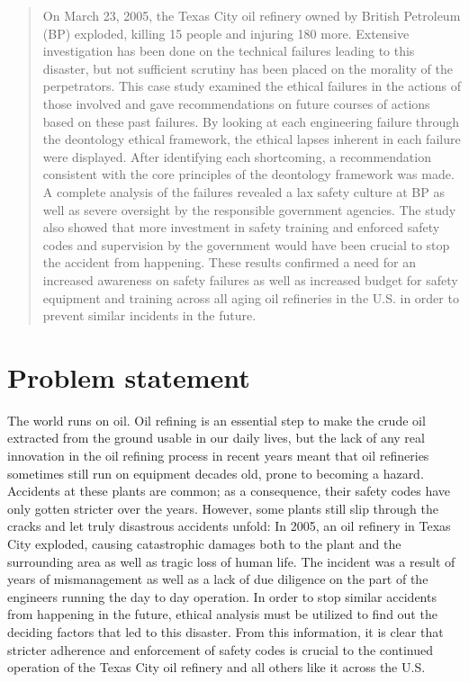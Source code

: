 \documentclass[12pt]{article}
\begin{document}
	\vspace{10mm}
	\begin{abstract}
	On March 23, 2005, the Texas City oil refinery owned by British Petroleum (BP) exploded, killing 15 people and injuring 180 more. Extensive investigation has been done on the technical failures leading to this disaster, but not sufficient scrutiny has been placed on the morality of the perpetrators. This case study examined the ethical failures in the actions of those involved and gave recommendations on future courses of actions based on these past failures. By looking at each engineering failure through the deontology ethical framework, the ethical lapses inherent in each failure were displayed. After identifying each shortcoming, a recommendation consistent with the core principles of the deontology framework was made. A complete analysis of the failures revealed a lax safety culture at BP as well as severe oversight by the responsible government agencies. The study also showed that more investment in safety training and enforced safety codes and supervision by the government would have been crucial to stop the accident from happening. These results confirmed a need for an increased awareness on safety failures as well as increased budget for safety equipment and training across all aging oil refineries in the U.S. in order to prevent similar incidents in the future.
	\end{abstract}
	\setlength{\parskip}{1em}

	\section*{Problem statement}
	The world runs on oil. Oil refining is an essential step to make the crude oil extracted from the ground usable in our daily lives, but the lack of any real innovation in the oil refining process in recent years meant that oil refineries sometimes still run on equipment decades old, prone to becoming a hazard. Accidents at these plants are common; as a consequence, their safety codes have only gotten stricter over the years. However, some plants still slip through the cracks and let truly disastrous accidents unfold: In 2005, an oil refinery in Texas City exploded, causing catastrophic damages both to the plant and the surrounding area as well as tragic loss of human life. The incident was a result of years of mismanagement as well as a lack of due diligence on the part of the engineers running the day to day operation. In order to stop similar accidents from happening in the future, ethical analysis must be utilized to find out the deciding factors that led to this disaster. From this information,  it is clear that stricter adherence and enforcement of safety codes is crucial to the continued operation of the Texas City oil refinery and all others like it across the U.S.
\end{document}
